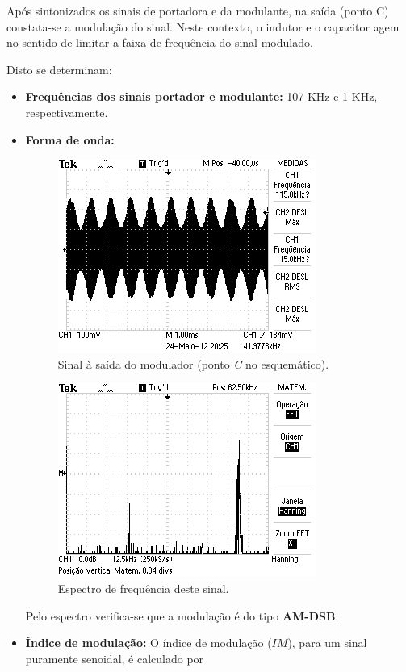 \documentclass[]{report}
\begin{document}
Após sintonizados os sinais de portadora e da modulante, na saída (ponto C) constata-se a modulação do sinal. Neste contexto, o indutor e o capacitor agem no sentido de limitar a faixa de frequência do sinal modulado.

Disto se determinam:
\begin{itemize}
\item{\bf Frequências dos sinais portador e modulante:} 107 KHz e 1 KHz, respectivamente.

\item{\bf Forma de onda:}
\begin{figure}[H]
\begin{center}
\includegraphics[scale=0.65]{./imagens/AM_Dominio_Tempo}
\end{center}
\caption{Sinal à saída do modulador (ponto \textit{C} no esquemático).}
\label{fig:onda_AM}
\end{figure}
\begin{figure}[H]
\begin{center}
\includegraphics[scale=0.65]{./imagens/AM_Dominio_Frequencia}
\end{center}
\caption{Espectro de frequência deste sinal.}
\label{fig:frequencia_AM}
\end{figure}

Pelo espectro verifica-se que a modulação é do tipo \textbf{AM-DSB}.
\item{\bf Índice de modulação:}
O índice de modulação ($IM$), para um sinal puramente senoidal, é calculado por


\end{itemize}
\end{document}
